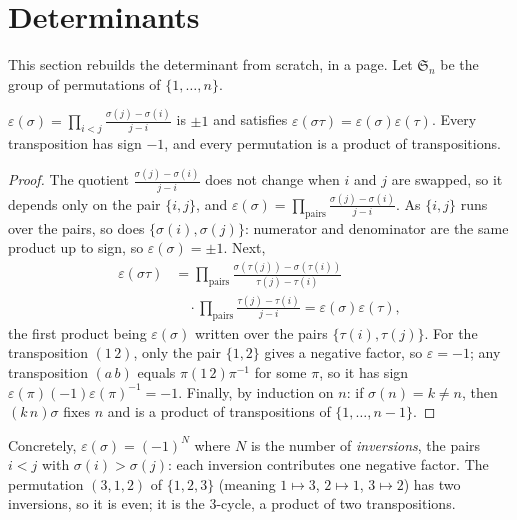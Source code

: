 \section{Determinants}

This section rebuilds the determinant from scratch, in a page. Let $\mathfrak S_n$ be the group of permutations of $\{1,\dots,n\}$.

\begin{lemma}\label{lem:sign}
$\varepsilon(\sigma)=\prod_{i<j}\frac{\sigma(j)-\sigma(i)}{j-i}$ is $\pm1$ and satisfies $\varepsilon(\sigma\tau)=\varepsilon(\sigma)\varepsilon(\tau)$. Every transposition has sign $-1$, and every permutation is a product of transpositions.
\end{lemma}
\begin{proof}
The quotient $\frac{\sigma(j)-\sigma(i)}{j-i}$ does not change when $i$ and $j$ are swapped, so it depends only on the pair $\{i,j\}$, and $\varepsilon(\sigma)=\prod_{\text{pairs}}\frac{\sigma(j)-\sigma(i)}{j-i}$. As $\{i,j\}$ runs over the pairs, so does $\{\sigma(i),\sigma(j)\}$: numerator and denominator are the same product up to sign, so $\varepsilon(\sigma)=\pm1$. Next,
\[
\begin{aligned}\varepsilon(\sigma\tau)&=\prod_{\text{pairs}}\frac{\sigma(\tau(j))-\sigma(\tau(i))}{\tau(j)-\tau(i)}\\&\quad\cdot\prod_{\text{pairs}}\frac{\tau(j)-\tau(i)}{j-i}=\varepsilon(\sigma)\varepsilon(\tau),\end{aligned}
\]
the first product being $\varepsilon(\sigma)$ written over the pairs $\{\tau(i),\tau(j)\}$. For the transposition $(1\,2)$, only the pair $\{1,2\}$ gives a negative factor, so $\varepsilon=-1$; any transposition $(a\,b)$ equals $\pi(1\,2)\pi^{-1}$ for some $\pi$, so it has sign $\varepsilon(\pi)(-1)\varepsilon(\pi)^{-1}=-1$. Finally, by induction on $n$: if $\sigma(n)=k\ne n$, then $(k\,n)\sigma$ fixes $n$ and is a product of transpositions of $\{1,\dots,n-1\}$.
\end{proof}

Concretely, $\varepsilon(\sigma)=(-1)^{N}$ where $N$ is the number of \emph{inversions}, the pairs $i<j$ with $\sigma(i)>\sigma(j)$: each inversion contributes one negative factor. The permutation $(3,1,2)$ of $\{1,2,3\}$ (meaning $1\mapsto3$, $2\mapsto1$, $3\mapsto2$) has two inversions, so it is even; it is the $3$-cycle, a product of two transpositions.

